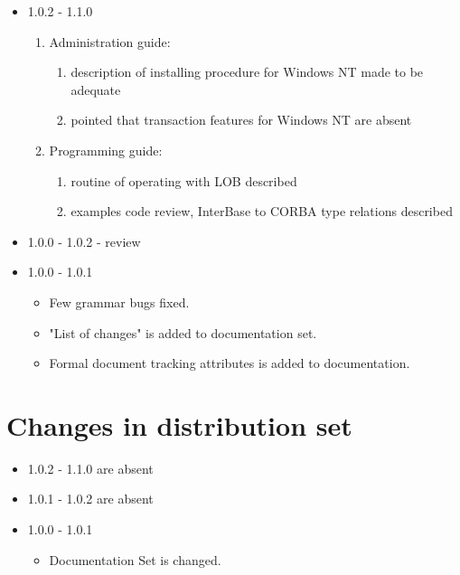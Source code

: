 \documentclass[10pt]{article}
\begin{document}
\begin{itemize}
 \item 1.0.2 - 1.1.0 \begin{enumerate}
                     \item Administration guide:
                           \begin{enumerate}
                           \item description of installing procedure for Windows NT
                                 made to be adequate
                           \item pointed that transaction features for Windows NT are absent
                           \end{enumerate}
                     \item Programming guide:
                           \begin{enumerate}
                           \item routine of operating with LOB described
                           \item examples code review, InterBase to CORBA type relations described
                           \end{enumerate}
                     \end{enumerate}
 \item 1.0.0 - 1.0.2 - review
 \item 1.0.0 - 1.0.1 
 \begin{itemize}
   \item Few grammar bugs fixed.
   \item "List of changes" is added to documentation set.
   \item Formal document tracking attributes is added to documentation.
 \end{itemize} 
\end{itemize}

\section{  Changes in  distribution set }
 
\begin{itemize}
  \item 1.0.2 - 1.1.0 are absent
  \item 1.0.1 - 1.0.2 are absent
  \item 1.0.0 - 1.0.1 
 \begin{itemize}
   \item Documentation Set is changed.
 \end{itemize} 
\end{itemize}
\end{document}
